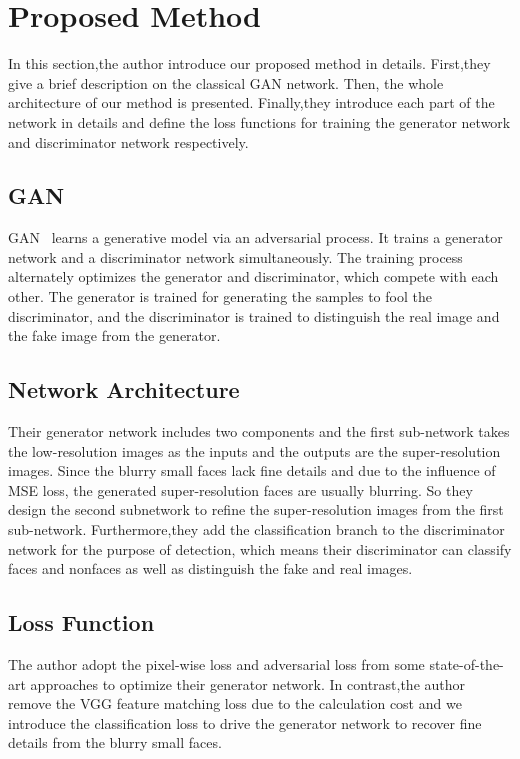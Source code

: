 \documentclass[10pt,twocolumn,letterpaper]{article}
\begin{document}
\section{Proposed Method}
In this section,the author introduce our proposed method in details.
First,they give a brief description on the classical GAN
network. Then, the whole architecture of our method is presented. Finally,they introduce each
part of the network in details and define the loss functions
for training the generator network and discriminator network
respectively.
\subsection{GAN}
GAN~\cite{Goodfellow2014Generative} learns a generative model via an adversarial
process. It trains a generator network and a discriminator
network simultaneously. The training process alternately
optimizes the generator and discriminator, which compete
with each other. The generator is trained for generating
the samples to fool the discriminator, and the discriminator is trained to distinguish the real image and the fake
image from the generator.
\subsection{Network Architecture}
Their generator network includes two components and the
first sub-network takes the low-resolution images as the inputs
and the outputs are the super-resolution images. Since
the blurry small faces lack fine details and due to the influence
of MSE loss, the generated super-resolution
faces are usually blurring. So they design the second subnetwork
to refine the super-resolution images from the first
sub-network. Furthermore,they add the classification branch
to the discriminator network for the purpose of detection,
which means their discriminator can classify faces and nonfaces
as well as distinguish the fake and real images.
\subsection{Loss Function}
The author adopt the pixel-wise loss and adversarial loss from
some state-of-the-art approaches to optimize their
generator network. In contrast,the author remove the VGG
feature matching loss due to the calculation cost and we introduce
the classification loss to drive the generator network
to recover fine details from the blurry small faces.
{\small


}
\end{document}
